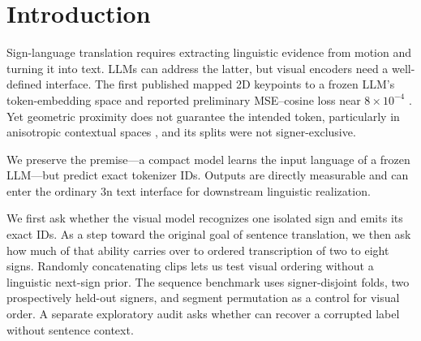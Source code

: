 \section{Introduction}

Sign-language translation requires extracting linguistic evidence from motion and
turning it into text.  LLMs can address the latter, but visual encoders need a
well-defined interface.  The first published \system{} mapped 2D keypoints to a
frozen LLM's token-embedding space and reported preliminary MSE--cosine loss near
$8\times10^{-4}$ \citep{velasquez2026imitator}.  Yet geometric proximity does not
guarantee the intended token, particularly in anisotropic contextual spaces
\citep{ethayarajh2019contextual}, and its splits were not signer-exclusive.

We preserve the premise---a compact model learns the input language of a frozen
LLM---but predict exact \Gemma{} tokenizer IDs.  Outputs are directly measurable
and can enter the ordinary \Gemma{} 3n text interface \citep{gemma3n} for
downstream linguistic realization.

We first ask whether the visual model recognizes one isolated sign and emits
its exact \Gemma{} IDs.  As a step toward the original goal of sentence
translation, we then ask how much of that ability carries over to ordered
transcription of two to eight signs.  Randomly concatenating clips lets us test
visual ordering without a linguistic next-sign prior.  The sequence benchmark
uses signer-disjoint folds, two prospectively held-out signers, and segment
permutation as a control for visual order.  A separate exploratory audit asks
whether \Gemma{} can recover a corrupted label without sentence context.
